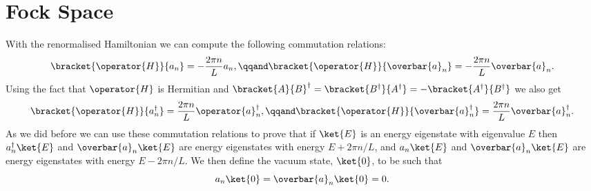 \documentclass[fleqn]{NotesClass}
\newcommand{\hermit}{{\dagger}}
\begin{document}
    \section{Fock Space}
    With the renormalised Hamiltonian we can compute the following commutation relations:
    \begin{equation}
        \bracket{\operator{H}}{a_n} = -\frac{2\pi n}{L} a_n, \qqand \bracket{\operator{H}}{\overbar{a}_n} = -\frac{2\pi n}{L} \overbar{a}_n.
    \end{equation}
    Using the fact that \(\operator{H}\) is Hermitian and \(\bracket{A}{B}^{\hermit} = \bracket{B^{\hermit}}{A^{\hermit}} = -\bracket{A^{\hermit}}{B^{\hermit}}\) we also get
    \begin{equation}
        \bracket{\operator{H}}{a_n^{\hermit}} = \frac{2\pi n}{L} \operator{a}_n^{\hermit}, \qqand \bracket{\operator{H}}{\overbar{a}_n^{\hermit}} = \frac{2\pi n}{L} \overbar{a}_n^{\hermit}.
    \end{equation}
    As we did before we can use these commutation relations to prove that if \(\ket{E}\) is an energy eigenstate with eigenvalue \(E\) then \(a_n^{\hermit}\ket{E}\) and \(\overbar{a}_n\ket{E}\) are energy eigenstates with energy \(E + 2\pi n/L\), and \(a_n\ket{E}\) and \(\overbar{a}_n\ket{E}\) are energy eigenstates with energy \(E - 2\pi n/L\).
    We then define the vacuum state, \(\ket{0}\), to be such that
    \begin{equation}
        a_n \ket{0} = \overbar{a}_n \ket{0} = 0.
    \end{equation}
    
\end{document}
